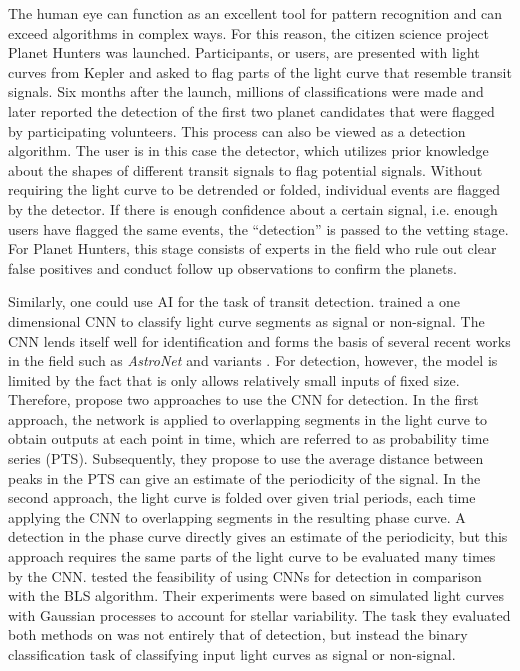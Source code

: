 The human eye can function as an excellent tool for pattern recognition and can exceed algorithms in complex ways. For this reason, the citizen science project Planet Hunters was launched. Participants, or users, are presented with light curves from Kepler and asked to flag parts of the light curve that resemble transit signals. Six months after the launch, millions of classifications were made and later \cite{fischer2012planet} reported the detection of the first two planet candidates that were flagged by participating volunteers. This process can also be viewed as a detection algorithm. The user is in this case the detector, which utilizes prior knowledge about the shapes of different transit signals to flag potential signals. Without requiring the light curve to be detrended or folded, individual events are flagged by the detector. If there is enough confidence about a certain signal, i.e. enough users have flagged the same events, the ``detection'' is passed to the vetting stage. For Planet Hunters, this stage consists of experts in the field who rule out clear false positives and conduct follow up observations to confirm the planets. 

Similarly, one could use AI for the task of transit detection. \cite{pearson2018searching} trained a one dimensional CNN to classify light curve segments as signal or non-signal. The CNN lends itself well for identification and forms the basis of several recent works in the field such as \textit{AstroNet} \citep{shallue2018identifying} and variants \citep{ansdell2018scientific, dattilo2019identifying, koning2019reducing, yu2019identifying, osborn2020rapid}. For detection, however, the model is limited by the fact that is only allows relatively small inputs of fixed size. Therefore, \cite{pearson2018searching} propose two approaches to use the CNN for detection. In the first approach, the network is applied to overlapping segments in the light curve to obtain outputs at each point in time, which are referred to as probability time series (PTS). Subsequently, they propose to use the average distance between peaks in the PTS can give an estimate of the periodicity of the signal. In the second approach, the light curve is folded over given trial periods, each time applying the CNN to overlapping segments in the resulting phase curve. A detection in the phase curve directly gives an estimate of the periodicity, but this approach requires the same parts of the light curve to be evaluated many times by the CNN. \cite{zucker2018shallow} tested the feasibility of using CNNs for detection in comparison with the BLS algorithm. Their experiments were based on simulated light curves with Gaussian processes to account for stellar variability. The task they evaluated both methods on was not entirely that of detection, but instead the binary classification task of classifying input light curves as signal or non-signal.


